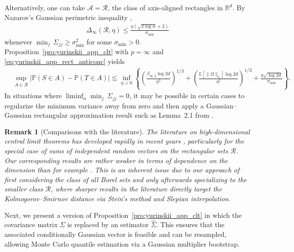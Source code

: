 \documentclass[11pt,lof]{puthesis}
\renewcommand{\P}{\ensuremath{\mathbb{P}}}
\newcommand{\R}{\ensuremath{\mathbb{R}}}
\newcommand{\E}{\ensuremath{\mathbb{E}}}
\newcommand{\cR}{\ensuremath{\mathcal{R}}}
\newcommand{\cA}{\ensuremath{\mathcal{A}}}
\theoremstyle{break}
\newtheorem{remark}{Remark}[section]
\theoremstyle{proof}
\begin{document}
Alternatively, one can take $\cA = \cR$,
the class of axis-aligned rectangles in $\R^d$.
By Nazarov's Gaussian perimetric inequality
\citep{nazarov2003maximal,chernozhukov2017central},
%
\begin{align}%
\label{eq:yurinskii_app_rect_anticonc}
\Delta_\infty(\cR, \eta)
\leq \frac{\eta (\sqrt{2\log d} + 2)}{\sigma_{\min}}
\end{align}
%
whenever $\min_j \, \Sigma_{j j} \geq \sigma_{\min}^2$
for some $\sigma_{\min}>0$.
Proposition~\ref{pro:yurinskii_app_clt} with $p = \infty$
and \eqref{eq:yurinskii_app_rect_anticonc} yields
%
\begin{align*}%
&\sup_{A\in \cR}
\big|\P(S\in A) -\P(T\in A)\big|
\lesssim
\inf_{\eta > 0}
\left\{
\left(\frac{\beta_{\infty,2} \log 2d}{\eta^3}\right)^{1/3}
+ \left(\frac{\E[\|\Omega \|_2] \log 2d}{\eta^2}\right)^{1/3}
+ \frac{\eta \sqrt{\log 2d}}{\sigma_{\min}}
\right\}.
\end{align*}
%
In situations where
$\liminf_n \min_j \, \Sigma_{j j} = 0$,
it may be possible in certain cases to regularize
the minimum variance away from zero and then apply
a Gaussian--Gaussian rectangular approximation result
such as Lemma~2.1 from \citet{chernozhukov2023nearly}.

\begin{remark}[Comparisons with the literature]

The literature on high-dimensional central limit theorems
has developed rapidly in recent years
\citep[see][and references therein]{%
zhai2018high,%
koike2021notes,%
buzun2022strong,%
lopes2022central,%
chernozhukov2023nearly%
},
particularly for the special case of
sums of independent random vectors
on the rectangular sets $\cR$.
%
Our corresponding results are rather weaker in terms of
dependence on the dimension than for example
\citet[Theorem~2.1]{chernozhukov2023nearly}.
This is an inherent issue due to our approach of first
considering the class of all Borel sets
and only afterwards specializing to the smaller class $\cR$,
where sharper results in the literature directly target the
Kolmogorov--Smirnov distance via Stein's method and Slepian interpolation.
\end{remark}

Next, we present a version of Proposition~\ref{pro:yurinskii_app_clt} in which
the covariance
matrix $\Sigma$ is replaced by an estimator $\hat \Sigma$. This ensures that
the associated conditionally Gaussian vector is feasible and can be resampled,
allowing Monte Carlo quantile estimation via a Gaussian
multiplier bootstrap.
\end{document}
